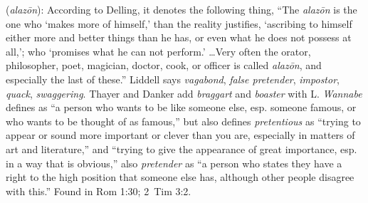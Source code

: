 \item[Wannabe,]

(\textit{alazōn}):
According to Delling, it denotes the following thing, ``The \emph{alazōn} is the one who `makes more of himself,' than the reality justifies, `ascribing to himself either more and better things than he has, or even what he does not possess at all,'; who `promises what he can not perform.' \ldots Very often the orator, philosopher, poet, magician, doctor, cook, or officer is called \emph{alazōn}, and especially the last of these.''
Liddell says \emph{vagabond}, \emph{false pretender}, \emph{impostor}, \emph{quack}, \emph{swaggering}. Thayer and Danker add \emph{braggart} and \emph{boaster} with L. \emph{Wannabe} defines as ``a person who wants to be like someone else, esp. someone famous, or who wants to be thought of as famous,'' but also defines \emph{pretentious} as ``trying to appear or sound more important or clever than you are, especially in matters of art and literature,'' and ``trying to give the appearance of great importance, esp. in a way that is obvious,'' also \emph{pretender} as ``a person who states they have a right to the high position that someone else has, although other people disagree with this.''
Found in Rom 1:30; 2~Tim 3:2.
